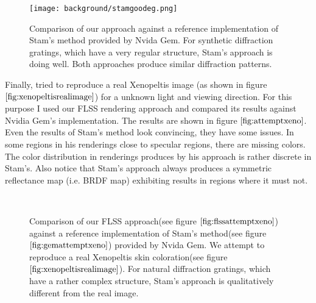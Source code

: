 \begin{figure}[H]
  \centering
  \texttt{[image: background/stamgoodeg.png]}
  \caption[Comparing Stam's approach: Good Example]{Comparison of our approach against a reference implementation of Stam's method provided by Nvida Gem. For synthetic diffraction gratings, which have a very regular structure, Stam's approach is doing well. Both approaches produce similar diffraction patterns.}
  \label{fig:stameggratingsgoodeg}  
\end{figure}

Finally, tried to reproduce a real Xenopeltis image (as shown in figure $\ref{fig:xenopeltisrealimage}$) for a unknown light and viewing direction. For this purpose I used our FLSS rendering approach and compared its results against Nvidia Gem's implementation. The results are shown in figure $\ref{fig:attemptxeno}$. Even the results of Stam's method look convincing, they have some issues. In some regions in his renderings close to specular regions, there are missing colors. The color distribution in renderings produces by his approach is rather discrete in Stam's. Also notice that Stam's approach always produces a symmetric reflectance map (i.e. BRDF map) exhibiting results in regions where it must not. 

\begin{figure}[H]
  \centering

~  
  
\caption[Snake Renderings: Stam's vs. FLSS Approach on Xenopeltis]{Comparison of our FLSS approach(see figure $\ref{fig:flssattemptxeno}$) against a reference implementation of Stam's method(see figure $\ref{fig:gemattemptxeno}$) provided by Nvida Gem. We attempt to reproduce a real Xenopeltis skin coloration(see figure $\ref{fig:xenopeltisrealimage}$). For natural diffraction gratings, which have a rather complex structure, Stam's approach is qualitatively different from the real image.}
\label{fig:attemptxeno}
\end{figure}

